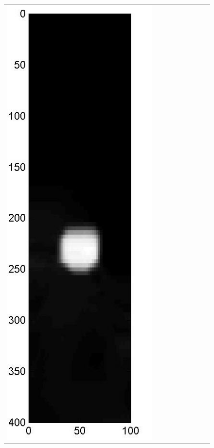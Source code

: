 \documentclass[11pt]{article}
\begin{document}
{\begin{figure}[!h]
\begin{center}
\begin{tabular}{|c|c|c|c|c|c|c|c|c|}
			\includegraphics[width=.9\iwidth]{figures/newFigs/noisy/resultsExp-5-mkTV}
			&

\end{tabular}
\end{center}
\end{figure}}
\end{document}
